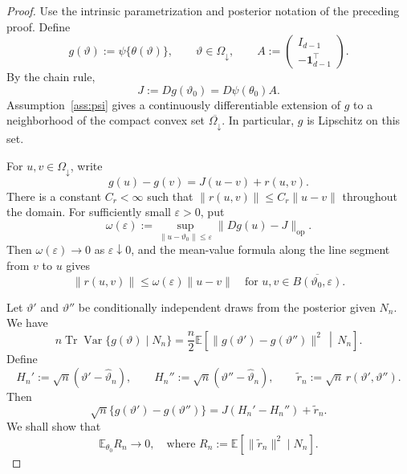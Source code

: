 \documentclass{article}
\theoremstyle{named}
\theoremstyle{named1}
\theoremstyle{plain}
\theoremstyle{remark}
\begin{document}
\begin{proof}
Use the intrinsic parametrization and posterior notation of the preceding
proof. Define
\[
    g(\vartheta):=\psi\{\theta(\vartheta)\},
    \qquad \vartheta\in\Omega_{\downarrow},
    \qquad
    A:=\begin{pmatrix}I_{d-1}\\-\mathbf1_{d-1}^\top\end{pmatrix}.
\]
By the chain rule,
\begin{equation}
    J:=Dg(\vartheta_0)=D\psi(\theta_0)A.
    \label{eq:functional-chain-rule}
\end{equation}
Assumption~\ref{ass:psi} gives a continuously differentiable extension of
$g$ to a neighborhood of the compact convex set
$\overline{\Omega_{\downarrow}}$. In particular, $g$ is Lipschitz on
this set.

For $u,v\in\Omega_{\downarrow}$, write
\[
    g(u)-g(v)=J(u-v)+r(u,v).
\]
There is a constant $C_r<\infty$ such that
$\|r(u,v)\|\leq C_r\|u-v\|$ throughout the domain. For sufficiently
small $\varepsilon>0$, put
\[
    \omega(\varepsilon)
    :=\sup_{\|u-\vartheta_0\|\leq\varepsilon}
      \|Dg(u)-J\|_{\mathrm{op}}.
\]
Then $\omega(\varepsilon)\to0$ as $\varepsilon\downarrow0$, and the
mean-value formula along the line segment from $v$ to $u$ gives
\[
    \|r(u,v)\|\leq\omega(\varepsilon)\|u-v\|
    \quad\text{for }u,v\in\overline{B(\vartheta_0,\varepsilon)}.
\]

Let $\vartheta'$ and $\vartheta''$ be conditionally independent draws
from the posterior given $N_n$. We have
\begin{equation}
    n\operatorname{Tr}\operatorname{Var}\{g(\vartheta)\mid N_n\}
    =\frac n2\mathbb E\left[
        \|g(\vartheta')-g(\vartheta'')\|^2\,\middle|\,N_n
    \right].
    \label{eq:variance-two-copy}
\end{equation}
Define
\[
    H_n':=\sqrt n(\vartheta'-\widehat\vartheta_n),
    \qquad
    H_n'':=\sqrt n(\vartheta''-\widehat\vartheta_n),
    \qquad
    \widetilde r_n:=\sqrt n\,r(\vartheta',\vartheta'').
\]
Then
\[
    \sqrt n\{g(\vartheta')-g(\vartheta'')\}
    =J(H_n'-H_n'')+\widetilde r_n.
\]
We shall show that
\begin{equation}
    \mathbb E_{\theta_0}R_n\rightarrow0,
    \quad \text {where }
    R_n:=\mathbb E[\|\widetilde r_n\|^2\mid N_n].
    \label{eq:multinomial-functional-remainder-L1}
\end{equation}


\end{proof}
\end{document}
